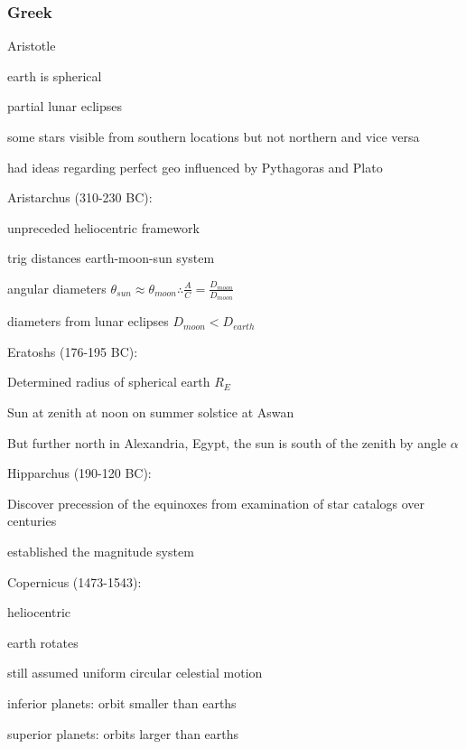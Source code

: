 \documentclass{article}
\begin{document}
\subsubsection{Greek}
\begin{list}{-}{}
\item Aristotle 
    \begin{list}{-}{}
    \item earth is spherical
    \item partial lunar eclipses
    \item some stars visible from southern locations but not northern and vice versa
    \item had ideas regarding perfect geo influenced by Pythagoras and Plato
    \end{list}
\item Aristarchus (310-230 BC):
\begin{list}{-}{}
\item unpreceded heliocentric framework
\item trig distances earth-moon-sun system
\item angular diameters $\theta_{sun} \approx \theta_{moon} \therefore \frac{A}{C} = \frac{D_{moon}}{D_{moon}}$
\item diameters from lunar eclipses $D_{moon} < D_{earth}$
\end{list} 
\item Eratoshs (176-195 BC):
\begin{list}{-}{}
\item Determined radius of spherical earth $R_{E}$
\item Sun at zenith at noon on summer solstice at Aswan 
\item But further north in Alexandria, Egypt, the sun is south of the zenith by angle $\alpha$
\end{list}
\item Hipparchus (190-120 BC):
\begin{list}{-}{}
\item Discover precession of the equinoxes from examination of star catalogs over centuries
\item established the magnitude system
\end{list}
\item Copernicus (1473-1543):
\begin{list}{-}{}
\item heliocentric
\item earth rotates
\item still assumed uniform circular celestial motion 
\item inferior planets: orbit smaller than earths
\item superior planets: orbits larger than earths
\end{list}
\end{list}
\end{document}
